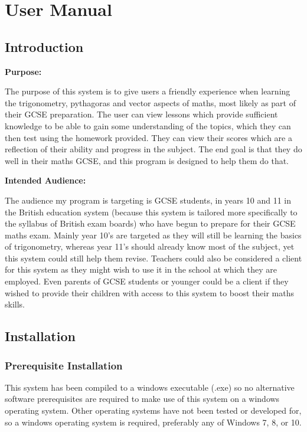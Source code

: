 \chapter{User Manual}

\section{Introduction}

\textbf{Purpose: }

The purpose of this system is to give users a friendly experience when learning the trigonometry, pythagoras and vector aspects of maths, most likely as part of their GCSE preparation. The user can view lessons which provide sufficient knowledge to be able to gain some understanding of the topics, which they can then test using the homework provided. They can view their scores which are a reflection of their ability and progress in the subject. The end goal is that they do well in their maths GCSE, and this program is designed to help them do that.

\textbf{Intended Audience: }

The audience my program is targeting is GCSE students, in years 10 and 11 in the British education system (because this system is tailored more specifically to the syllabus of British exam boards) who have begun to prepare for their GCSE maths exam. Mainly year 10's are targeted as they will still be learning the basics of trigonometry, whereas year 11's should already know most of the subject, yet this system could still help them revise. Teachers could also be considered a client for this system as they might wish to use it in the school at which they are employed. Even parents of GCSE students or younger could be a client if they wished to provide their children with access to this system to boost their maths skills.

\section{Installation}

\subsection{Prerequisite Installation}

This system has been compiled to a windows executable (.exe) so no alternative software prerequisites are required to make use of this system on a windows operating system. Other operating systems have not been tested or developed for, so a windows operating system is required, preferably any of Windows 7, 8, or 10.

